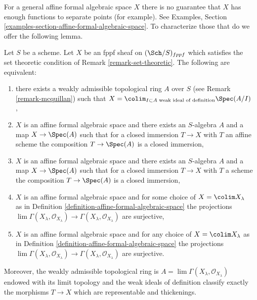 \noindent
For a general affine formal algebraic space $X$ there is no guarantee
that $X$ has enough functions to separate points (for example).
See Examples, Section \ref{examples-section-affine-formal-algebraic-space}.
To characterize those that do we offer the following lemma.

\begin{lemma}
\label{lemma-mcquillan-affine-formal-algebraic-space}
Let $S$ be a scheme. Let $X$ be an fppf sheaf on $(\Sch/S)_{fppf}$
which satisfies the set theoretic condition of
Remark \ref{remark-set-theoretic}.
The following are equivalent:
\begin{enumerate}
\item there exists a weakly admissible topological ring $A$ over $S$
(see Remark \ref{remark-mcquillan}) such that
$X = \colim_{I \subset A\text{ weak ideal of definition}} \Spec(A/I)$,
\item $X$ is an affine formal algebraic space and
there exists an $S$-algebra $A$ and a map $X \to \Spec(A)$
such that for a closed immersion $T \to X$ with $T$ an affine scheme
the composition $T \to \Spec(A)$ is a closed immersion,
\item $X$ is an affine formal algebraic space and
there exists an $S$-algebra $A$ and a map $X \to \Spec(A)$
such that for a closed immersion $T \to X$ with $T$ a scheme
the composition $T \to \Spec(A)$ is a closed immersion,
\item $X$ is an affine formal algebraic space and
for some choice of $X = \colim X_\lambda$ as in
Definition \ref{definition-affine-formal-algebraic-space}
the projections $\lim \Gamma(X_\lambda, \mathcal{O}_{X_\lambda})
\to \Gamma(X_\lambda, \mathcal{O}_{X_\lambda})$ are surjective,
\item $X$ is an affine formal algebraic space and for any choice
of $X = \colim X_\lambda$ as in
Definition \ref{definition-affine-formal-algebraic-space}
the projections $\lim \Gamma(X_\lambda, \mathcal{O}_{X_\lambda})
\to \Gamma(X_\lambda, \mathcal{O}_{X_\lambda})$ are surjective.
\end{enumerate}
Moreover, the weakly admissible topological ring is
$A = \lim \Gamma(X_\lambda, \mathcal{O}_{X_\lambda})$
endowed with its limit topology and the weak ideals of definition
classify exactly the morphisms $T \to X$ which are representable
and thickenings.
\end{lemma}

